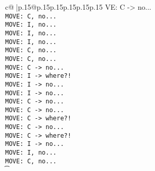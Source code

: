 \documentclass{article}
\begin{document}
{\begin{supertabular}{c@{$\;$}|p{.15\linewidth}@{}p{.15\linewidth}p{.15\linewidth}p{.15\linewidth}p{.15\linewidth}p{.15\linewidth}}
{{{VE: C -> no...\\ \tt  MOVE: C, no...\\ \tt  MOVE: I, no...\\ \tt  MOVE: I, no...\\ \tt  MOVE: I, no...\\ \tt  MOVE: C, no...\\ \tt  MOVE: C, no...\\ \tt  MOVE: C -> no...\\ \tt  MOVE: I -> where?!\\ \tt  MOVE: I -> no...\\ \tt  MOVE: I -> no...\\ \tt  MOVE: C -> no...\\ \tt  MOVE: C -> no...\\ \tt  MOVE: C -> where?!\\ \tt  MOVE: C -> no...\\ \tt  MOVE: C -> where?!\\ \tt  MOVE: I -> no...\\ \tt  MOVE: I, no...\\ \tt  MOVE: C, no...\\ \t}}}
\end{supertabular}}
\end{document}
